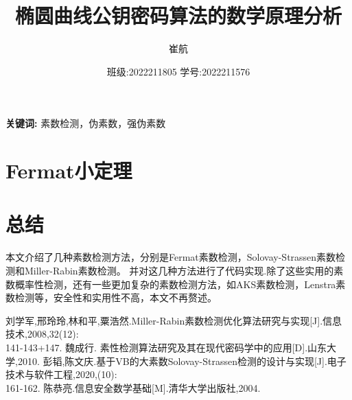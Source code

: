 \documentclass[a4paper]{article}
\title{\heiti\zihao{3} 椭圆曲线公钥密码算法的数学原理分析}
\date{班级:2022211805 学号:2022211576}
\author{\songti 崔航}
\providecommand{\keywords}[1]
{
    \small	
    \textbf{关键词:} #1
}
\providecommand{\keywords}[1]
{
  \small	
  \textbf{关键词:} #1
}
\begin{document}
    \maketitle
\begin{abstract}

\end{abstract}
\keywords{素数检测，伪素数，强伪素数}
\tableofcontents
\section{Fermat小定理}

\section{总结}
本文介绍了几种素数检测方法，分别是Fermat素数检测，Solovay-Strassen素数检测和Miller-Rabin素数检测。
并对这几种方法进行了代码实现.除了这些实用的素数概率性检测，还有一些更加复杂的素数检测方法，如AKS素数检测，Lenstra素数检测等，安全性和实用性不高，本文不再赘述。
\begin{thebibliography}{1000}  
    
    刘学军,邢玲玲,林和平,粟浩然.Miller-Rabin素数检测优化算法研究与实现[J].信息技术,2008,32(12):
    \\141-143+147.
    魏成行. 素性检测算法研究及其在现代密码学中的应用[D].山东大学,2010.
    彭韬,陈文庆.基于VB的大素数Solovay-Strassen检测的设计与实现[J].电子技术与软件工程,2020,(10):
    \\161-162.
    陈恭亮.信息安全数学基础[M].清华大学出版社,2004.
\end{thebibliography}
\end{document}
